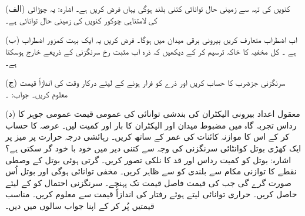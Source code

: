 (الف) کنویں کی تہہ سے زمینی حال توانائی کتنی بلند ہوگی یہاں فرض کریں  ہے۔ اشارہ: یہ  چوڑائی کی لامتناہی چوکور کنویں کی زمینی حال توانائی ہے۔

(ب) اب اضطراب  متعارف کریں بیرونی برقی میدان  میں  ہوگا۔ فرض کریں یہ ایک بہت کمزور اضطراب ہے ۔ کل مخفیہ کا خاکہ ترسیم کر کے دیکھیں کہ ذرہ اب مثبت  رخ سرنگزنی کے ذریعے خارج ہوسکتا ہے۔

(ج) سرنگزنی جزضرب   کا حساب کریں اور ذرے کو فرار ہونے کے لیئے درکار وقت کی اندازاً قیمت  معلوم کریں۔ جواب: ۔

(د) معقول اعداد  بیرونی الیکٹران کی بندشی توانائی کی عمومی قیمت  عمومی جوہر کا رداس  تجربہ گاہ میں مضبوط میدان  اور  الیکٹران کا بار اور کمیت لیں۔ عرصہ  کا حساب کر کے اس کا موازنہ کائنات کی عمر کے ساتھ کریں۔
رہائشی درجہ حرارت پر میز پر ایک کھڑی بوتل کوانٹائی سرنگزنی کی وجہ سے کتنی دیر میں خود با خود گر سکتی ہے؟ اشارہ: بوتل کو کمیت  رداس  اور قد  کا نلکی تصور کریں۔ گرتی ہوئی بوتل کے وصطی نقطے کا توازنی مکام  سے بلندی کو  سے ظاہر کریں۔ مخفی توانائی  ہوگی اور بوتل اُس صورت گرے گی جب  کی قیمت فاصل قیمت  تک پہنچے۔ سرنگزنی احتمال  کو  کے لیئے حاصل کریں۔ حراری توانائی  لیتے ہوئے رفتار کی اندازاً 	قیمت  سے معلوم کریں۔ مناسب قیمتیں پُر کر کے اپنا جواب سالوں میں دیں۔

